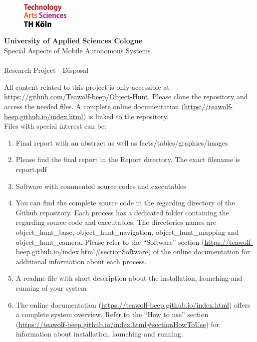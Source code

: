 \documentclass[a4paper,11pt,oneside]{article}
\begin{document}
  \pagestyle{fancy} %
  \fancyhead{}
  \fancyhf{}
  \renewcommand{\headrulewidth}{0pt}
  \renewcommand{\footrulewidth}{0.4pt}
  \fancyfoot[R] {}
  \begin{figure}
    \includegraphics[width=0.2\textwidth]{sources/logo_TH-Koeln_CMYK_22pt}
  \end{figure}
  \Large
  \textbf{University of Applied Sciences Cologne}\\
  Special Aspects of Mobile Autonomous Systems\\
  \\
  \large
  Research Project - Disposal\\

\vspace{5mm}

All content related to this project is only accessible at \url{https://github.com/Teawolf-beep/Object-Hunt}. Please clone the repository and access the needed files. A complete online documentation (\url{https://teawolf-beep.github.io/index.html}) is linked to the repository.\\
Files with special interest can be:

\begin{enumerate}
\item Final report with an abstract as well as facts/tables/graphics/images
\item[] Please find the final report in the Report directory. The exact filename is report.pdf
\item Software with commented source codes and executables
\item[] You can find the complete source code in the regarding directory of the Github repository. Each process has a dedicated folder containing the regarding source code and executables. The directories names are object\_hunt\_base, object\_hunt\_navigation, object\_hunt\_mapping and object\_hunt\_camera. Please refer to the ``Software'' section (\url{https://teawolf-beep.github.io/index.html#sectionSoftware}) of the online documentation for additional information about each process.
\item A readme file with short description about the installation, launching and running of your system
\item[] The online documentation (\url{https://teawolf-beep.github.io/index.html}) offers a complete system overview. Refer to the ``How to use'' section (\url{https://teawolf-beep.github.io/index.html#sectionHowToUse}) for information about installation, launching and running.
\end{enumerate}
  
\end{document}
